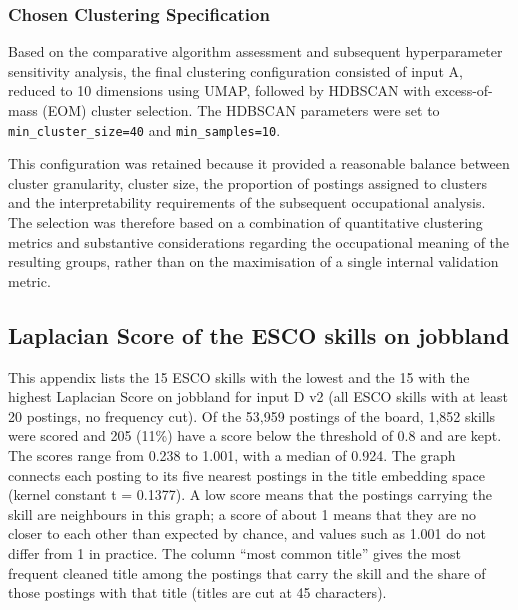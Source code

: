 \documentclass[
  letterpaper,
  DIV=11,
  numbers=noendperiod,
  sfdefaults=false]{scrartcl}
\begin{document}
\subsubsection{Chosen Clustering
Specification}\label{chosen-clustering-specification}

Based on the comparative algorithm assessment and subsequent
hyperparameter sensitivity analysis, the final clustering configuration
consisted of input A, reduced to 10 dimensions using UMAP, followed by
HDBSCAN with excess-of-mass (EOM) cluster selection. The HDBSCAN
parameters were set to \texttt{min\_cluster\_size=40} and
\texttt{min\_samples=10}.

This configuration was retained because it provided a reasonable balance
between cluster granularity, cluster size, the proportion of postings
assigned to clusters and the interpretability requirements of the
subsequent occupational analysis. The selection was therefore based on a
combination of quantitative clustering metrics and substantive
considerations regarding the occupational meaning of the resulting
groups, rather than on the maximisation of a single internal validation
metric.

\subsection{Laplacian Score of the ESCO skills on
jobbland}\label{sec-appendix-ls}

This appendix lists the 15 ESCO skills with the lowest and the 15 with
the highest Laplacian Score on jobbland for input D v2 (all ESCO skills
with at least 20 postings, no frequency cut). Of the 53,959 postings of
the board, 1,852 skills were scored and 205 (11\%) have a score below
the threshold of 0.8 and are kept. The scores range from 0.238 to 1.001,
with a median of 0.924. The graph connects each posting to its five
nearest postings in the title embedding space (kernel constant t =
0.1377). A low score means that the postings carrying the skill are
neighbours in this graph; a score of about 1 means that they are no
closer to each other than expected by chance, and values such as 1.001
do not differ from 1 in practice. The column ``most common title'' gives
the most frequent cleaned title among the postings that carry the skill
and the share of those postings with that title (titles are cut at 45
characters).
\end{document}
